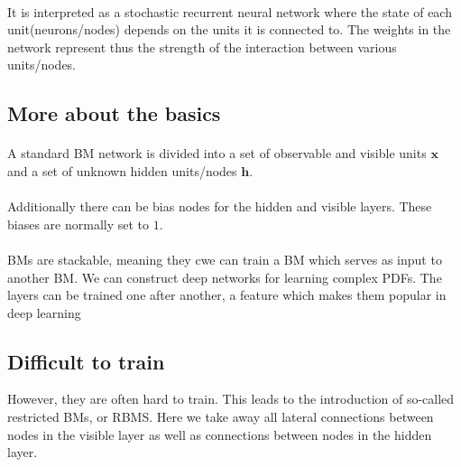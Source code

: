 \documentclass[%
oneside,                 %
final,                   %
10pt]{article}
\begin{document}
\paragraph{}
It is interpreted as a stochastic recurrent neural network where the
state of each unit(neurons/nodes) depends on the units it is connected
to. The weights in the network represent thus the strength of the
interaction between various units/nodes.



\subsection{More about the basics}

\paragraph{}
A standard BM network is divided into a set of observable and visible units $\bm{x}$ and a set of unknown hidden units/nodes $\bm{h}$.




\paragraph{}
Additionally there can be bias nodes for the hidden and visible layers. These biases are normally set to $1$.




\paragraph{}
BMs are stackable, meaning they cwe can train a BM which serves as input to another BM. We can construct deep networks for learning complex PDFs. The layers can be trained one after another, a feature which makes them popular in deep learning



\subsection{Difficult to train}

However, they are often hard to train. This leads to the introduction
of so-called restricted BMs, or RBMS.  Here we take away all lateral
connections between nodes in the visible layer as well as connections
between nodes in the hidden layer.
\end{document}

